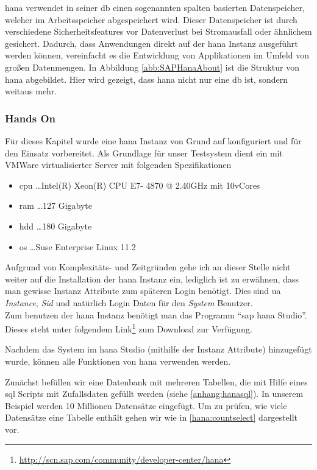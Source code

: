 \gls{hana} verwendet in seiner \gls{db} einen sogenannten spalten basierten Datenspeicher, welcher im Arbeitsspeicher abgespeichert wird. Dieser Datenspeicher ist durch verschiedene Sicherheitsfeatures vor Datenverlust bei Stromausfall oder ähnlichem gesichert.
Dadurch, dass Anwendungen direkt auf der \gls{hana} Instanz ausgeführt werden können, vereinfacht es die Entwicklung von Applikationen im Umfeld von großen Datenmengen. In Abbildung \ref{abb:SAPHanaAbout} ist die Struktur von \gls{hana} abgebildet. Hier wird gezeigt, dass \gls{hana} nicht nur eine \gls{db} ist, sondern weitaus mehr.

\subsubsection{Hands On}
\label{sec:db-hana-ho}
Für dieses Kapitel wurde eine \gls{hana} Instanz von Grund auf konfiguriert und für den Einsatz vorbereitet. 
Als Grundlage für unser Testsystem dient ein mit VMWare virtualisierter Server mit folgenden Spezifikationen
\begin{itemize}
	\item \gls{cpu} \ldots Intel(R) Xeon(R) CPU E7- 4870  @ 2.40GHz mit 10vCores
	\item \gls{ram} \ldots 127 Gigabyte
	\item \gls{hdd} \ldots 180 Gigabyte
	\item \gls{os} \ldots Suse Enterprise Linux 11.2	
\end{itemize}

Aufgrund von Komplexitäts- und Zeitgründen gehe ich an dieser Stelle nicht weiter auf die Installation der \gls{hana} Instanz ein, lediglich ist zu erwähnen, dass man gewisse Instanz Attribute zum späteren Login benötigt. Dies sind \gls{ua} \emph{Instance}, \emph{Sid} und natürlich Login Daten für den \emph{System} Benutzer.\\
Zum benutzen der \gls{hana} Instanz benötigt man das Programm "`\gls{sap} \gls{hana} Studio"'. Dieses steht unter folgendem Link\footnote{\url{http://scn.sap.com/community/developer-center/hana}} zum Download zur Verfügung.

Nachdem das System im \gls{hana} Studio (mithilfe der Instanz Attribute) hinzugefügt wurde, können alle Funktionen von \gls{hana} verwenden werden.

Zunächst befüllen wir eine Datenbank mit mehreren Tabellen, die mit Hilfe eines \gls{sql} Scripts mit Zufallsdaten gefüllt werden (siehe \ref{anhang:hanasql}). In unserem Beispiel werden 10 Millionen Datensätze eingefügt. Um zu prüfen, wie viele Datensätze eine Tabelle enthält gehen wir wie in \ref{hana:countselect} dargestellt vor.

